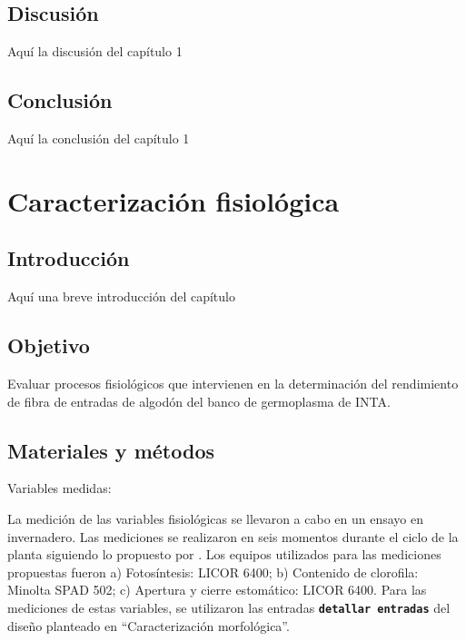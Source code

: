 \documentclass[12pt,oneside]{reedthesis}
\begin{document}
\section{Discusión}\label{discusiuxf3n}

Aquí la discusión del capítulo 1

\section{Conclusión}\label{conclusiuxf3n}

Aquí la conclusión del capítulo 1

\chapter{Caracterización fisiológica}\label{math-sci}

\section{Introducción}\label{introducciuxf3n-2}

Aquí una breve introducción del capítulo

\section{Objetivo}\label{objetivo-1}

Evaluar procesos fisiológicos que intervienen en la determinación del rendimiento de fibra de entradas de algodón del banco de germoplasma de INTA.

\section{Materiales y métodos}\label{materiales-y-muxe9todos-1}

Variables medidas:

La medición de las variables fisiológicas se llevaron a cabo en un ensayo en invernadero. Las mediciones se realizaron en seis momentos durante el ciclo de la planta siguiendo lo propuesto por \autocite{luo2017}. Los equipos utilizados para las mediciones propuestas fueron a) Fotosíntesis: LICOR 6400; b) Contenido de clorofila: Minolta SPAD 502; c) Apertura y cierre estomático: LICOR 6400. Para las mediciones de estas variables, se utilizaron las entradas \textbf{\texttt{detallar\ entradas}} del diseño planteado en ``Caracterización morfológica''.
\end{document}
